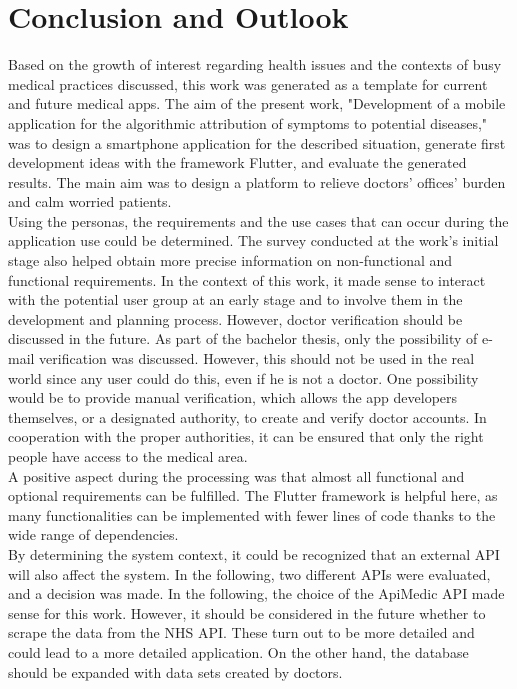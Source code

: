 \chapter{Conclusion and Outlook}
Based on the growth of interest regarding health issues and the contexts of busy medical practices discussed, this work was generated as a template for current and future medical apps.
The aim of the present work, "Development of a mobile application for the algorithmic attribution of symptoms to potential diseases," was to design a smartphone application for the described situation, generate first development ideas with the framework Flutter, and evaluate the generated results. The main aim was to design a platform to relieve doctors' offices' burden and calm worried patients. 
\newline \\
Using the personas, the requirements and the use cases that can occur during the application use could be determined. The survey conducted at the work's initial stage also helped obtain more precise information on non-functional and functional requirements. In the context of this work, it made sense to interact with the potential user group at an early stage and to involve them in the development and planning process. However, doctor verification should be discussed in the future. As part of the bachelor thesis, only the possibility of e-mail verification was discussed. However, this should not be used in the real world since any user could do this, even if he is not a doctor. One possibility would be to provide manual verification, which allows the app developers themselves, or a designated authority, to create and verify doctor accounts. In cooperation with the proper authorities, it can be ensured that only the right people have access to the medical area.
\newline \\
A positive aspect during the processing was that almost all functional and optional requirements can be fulfilled. The Flutter framework is helpful here, as many functionalities can be implemented with fewer lines of code thanks to the wide range of dependencies.
\newline \\
By determining the system context, it could be recognized that an external API will also affect the system. In the following, two different APIs were evaluated, and a decision was made. In the following, the choice of the ApiMedic API made sense for this work. However, it should be considered in the future whether to scrape the data from the NHS API. These turn out to be more detailed and could lead to a more detailed application. On the other hand, the database should be expanded with data sets created by doctors. 
